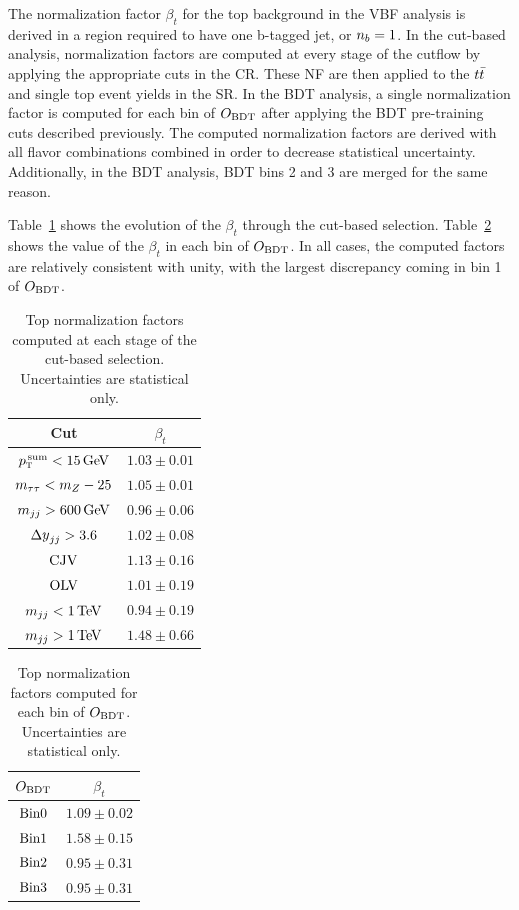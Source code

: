 The normalization factor $\beta_{t}$ for the top background in the VBF analysis is derived in a region required to have one b-tagged jet, or $n_b = 1$. In the cut-based analysis, normalization factors are computed at every stage of the cutflow by applying the appropriate cuts in the CR. These NF are then applied to the $t\bar{t}$ and single top event yields in the SR. In the BDT analysis, a single normalization factor is computed for each bin of $O_{\rm BDT}$ after applying the BDT pre-training cuts described previously. The computed normalization factors are derived with all flavor combinations combined in order to decrease statistical uncertainty. Additionally, in the BDT analysis, BDT bins 2 and 3 are merged for the same reason.

Table~\ref{tab:vbf_cb_topnf} shows the evolution of the $\beta_{t}$ through the cut-based selection. Table~\ref{tab:vbf_bdt_topnf} shows the value of the $\beta_{t}$ in each bin of $O_{\rm BDT}$. In all cases, the computed factors are relatively consistent with unity, with the largest discrepancy coming in bin 1 of $O_{\rm BDT}$. 

\begin{table}[h!]
\centering
\captionsetup{justification=centering}
\begin{tabular}{|c|c|}
\hline
Cut & $\beta_t$ \\ \hline
$\pTtot < 15 \GeV$ & $1.03 \pm 0.01$ \\ \hline
$m_{\tau\tau} < m_Z - 25$ & $1.05 \pm 0.01$ \\ \hline
$\mjj > 600 \GeV$ & $0.96 \pm 0.06$ \\ \hline
$\dyjj > 3.6 $ & $1.02 \pm 0.08$ \\ \hline
$\rm CJV$ & $1.13 \pm 0.16$ \\ \hline
$\rm OLV$ & $1.01 \pm 0.19$ \\ \hline
$\mjj < 1 \TeV$ & $0.94 \pm 0.19$ \\ \hline
$\mjj > 1 \TeV$ & $1.48 \pm 0.66$ \\ \hline 
\end{tabular}
\caption{Top normalization factors computed at each stage of the cut-based selection. Uncertainties are statistical only.}
\label{tab:vbf_cb_topnf}
\end{table}

\begin{table}[h!]
\centering
\captionsetup{justification=centering}
\begin{tabular}{|c|c|}
\hline
$O_{\rm BDT}$ & $\beta_t$ \\ \hline
$\rm Bin 0$ & $1.09 \pm 0.02$ \\ \hline
$\rm Bin 1$ & $1.58 \pm 0.15$ \\ \hline
$\rm Bin 2$ & $0.95 \pm 0.31$ \\ \hline
$\rm Bin 3$ & $0.95 \pm 0.31$ \\ \hline
\end{tabular}
\caption{Top normalization factors computed for each bin of $O_{\rm BDT}$. Uncertainties are statistical only.}
\label{tab:vbf_bdt_topnf}
\end{table}


